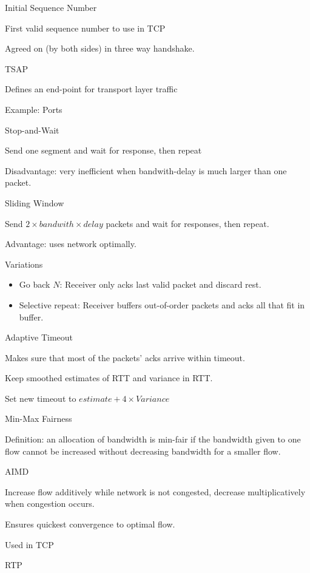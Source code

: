 \documentclass[main.tex]{subfiles}
\begin{document}
\begin{card}[ISN]{Initial Sequence Number}
\item First valid sequence number to use in TCP
\item Agreed on (by both sides) in three way handshake.
\end{card}

\begin{card}{TSAP}
\item Defines an end-point for transport layer traffic
\item Example: Ports
\end{card}

\begin{card}{Stop-and-Wait}
\item Send one segment and wait for response, then repeat
\item Disadvantage: very inefficient when bandwith-delay is much larger than one packet.
\end{card}

\begin{card}{Sliding Window}
\item Send $2\times bandwith \times delay$ packets and wait for responses, then repeat.
\item Advantage: uses network optimally.
\item Variations
    \begin{itemize}
        \item Go back $N$: Receiver only acks last valid packet and discard rest.
        \item Selective repeat: Receiver buffers out-of-order packets and acks all that fit in buffer.
    \end{itemize}
\end{card}

\begin{card}{Adaptive Timeout}
\item Makes sure that most of the packets' acks arrive within timeout.
\item Keep smoothed estimates of RTT and variance in RTT.
\item Set new timeout to $estimate + 4\times Variance$
\end{card}

\begin{card}{Min-Max Fairness}
\item Definition: an allocation of bandwidth is min-fair if the bandwidth given to one flow cannot be increased without decreasing bandwidth for a smaller flow.
\end{card}

\begin{card}{AIMD}
\item Increase flow additively while network is not congested, decrease multiplicatively when congestion occurs.
\item Ensures quickest convergence to optimal flow.
\item Used in TCP
\end{card}

\begin{card}{RTP}
\TODO
\end{card}
\end{document}
